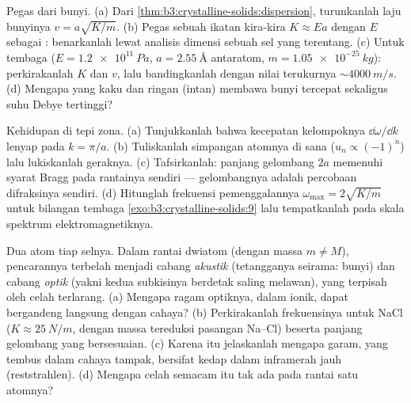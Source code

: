 \begin{exercise}[$\star\star$]\label{exo:b3:crystalline-solids:9}
Pegas dari bunyi. (a) Dari
\cref{thm:b3:crystalline-solids:dispersion}, turunkanlah laju
bunyinya $v = a\sqrt{K/m}$. (b) Pegas sebuah ikatan kira-kira $K \approx
Ea$ dengan $E$ sebagai : benarkanlah lewat analisis dimensi
sebuah sel yang terentang. (c) Untuk tembaga ($E = \qty{1.2e11}{Pa}$,
$a = \qty{2.55}{\angstrom}$ antaratom, $m =
\qty{1.05e-25}{kg}$): perkirakanlah $K$ dan $v$, lalu bandingkanlah dengan
nilai terukurnya $\sim\qty{4000}{m/s}$. (d) Mengapa  yang kaku dan ringan
(intan) membawa bunyi tercepat sekaligus suhu Debye tertinggi?
\end{exercise}

\begin{exercise}[$\star\star\star$]\label{exo:b3:crystalline-solids:10}
Kehidupan di tepi zona. (a) Tunjukkanlah bahwa kecepatan kelompoknya
$\dd\omega/\dd k$ lenyap pada $k = \pi/a$. (b) Tuliskanlah simpangan
atomnya di sana ($u_n \propto (-1)^n$) lalu lukiskanlah geraknya. (c)
Tafsirkanlah: panjang gelombang $2a$ memenuhi syarat Bragg
pada rantainya sendiri --- gelombangnya adalah percobaan difraksinya
sendiri. (d) Hitunglah frekuensi pemenggalannya
$\omega_{\text{max}} = 2\sqrt{K/m}$ untuk bilangan tembaga
\cref{exo:b3:crystalline-solids:9} lalu tempatkanlah pada skala
spektrum elektromagnetiknya.
\end{exercise}

\begin{exercise}[$\star\star\star$]\label{exo:b3:crystalline-solids:11}
Dua atom tiap selnya. Dalam rantai dwiatom (dengan massa $m \ne M$),
pencarannya terbelah menjadi cabang \emph{akustik} (tetangganya
seirama: bunyi) dan cabang \emph{optik} (yakni kedua subkisinya
berdetak saling melawan), yang terpisah oleh celah terlarang. (a) Mengapa
ragam optiknya, dalam  ionik, dapat bergandeng langsung dengan
cahaya? (b) Perkirakanlah frekuensinya untuk NaCl ($K \approx
\qty{25}{N/m}$, dengan massa tereduksi pasangan Na--Cl) beserta
panjang gelombang yang bersesuaian. (c) Karena itu jelaskanlah mengapa garam, yang
tembus dalam cahaya tampak, bersifat kedap dalam inframerah jauh (reststrahlen). (d)
Mengapa celah semacam itu tak ada pada rantai satu atomnya?
\end{exercise}


